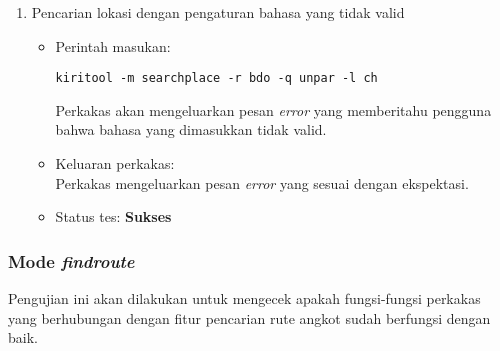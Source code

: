 \begin{enumerate}
	\item Pencarian lokasi dengan pengaturan bahasa yang tidak valid
	\begin{itemize}
		\item Perintah masukan:
		\begin{verbatim}
kiritool -m searchplace -r bdo -q unpar -l ch
		\end{verbatim}
		Perkakas akan mengeluarkan pesan \textit{error} yang memberitahu pengguna bahwa bahasa yang dimasukkan tidak valid.
		\item Keluaran perkakas: \\
		Perkakas mengeluarkan pesan \textit{error} yang sesuai dengan ekspektasi.
		\item Status tes: \textbf{Sukses}
	\end{itemize}
	
\end{enumerate}

\subsubsection{Mode \textit{findroute}}
\label{sec:testing-experiments-testing-findroute}

Pengujian ini akan dilakukan untuk mengecek apakah fungsi-fungsi perkakas yang berhubungan dengan fitur pencarian rute angkot sudah berfungsi dengan baik.

